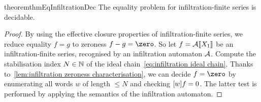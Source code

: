 %
\begin{restatable}{theorem}{thmEqInfiltrationDec}
    \label{thm:infiltration finite - decidable equality}
    The equality problem for infiltration-finite series is decidable.
\end{restatable}
\begin{proof}%
    By using the effective closure properties of infiltration-finite series,
    we reduce equality $f = g$ to zeroness $f - g = \zero$.
    So let $f = \Asem \AA {X_1}$ be an infiltration-finite series,
    recognised by an infiltration automaton $\AA$.
    Compute the stabilisation index $N \in \N$ of the ideal chain~\cref{eq:infiltration ideal chain}.
    Thanks to~\cref{lem:infiltration zeroness characterisation},
    we can decide $f = \zero$
    by enumerating all words $w$ of length $\leq N$
    and checking $\coefficient w f = 0$.
    The latter test is performed by applying the semantics of the infiltration automaton.
\end{proof}

